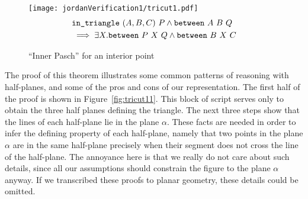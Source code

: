 \begin{figure}
\centering\texttt{[image: jordanVerification1/tricut1.pdf]}
\begin{equation}\label{eq:tricut1}
  \begin{split}
    &\texttt{in\_triangle}\ (A,B,C)\ P \wedge \texttt{between}\ A\ B\ Q \\
    &\implies\exists X. \texttt{between}\ P\ X\ Q \wedge \texttt{between}\ B\ X\ C
  \end{split}
\end{equation}
\caption{``Inner Pasch'' for an interior point}
\label{fig:tricut1}
\end{figure}

The proof of this theorem illustrates some common patterns of reasoning with half-planes, and some of the pros and cons of our representation. The first half of the proof is shown in Figure~\ref{fig:tricut11}. This block of script serves only to obtain the three half planes defining the triangle. The next three steps show that the lines of each half-plane lie in the plane $\alpha$. These facts are needed in order to infer the defining property of each half-plane, namely that two points in the plane $\alpha$ are in the same half-plane precisely when their segment does not cross the line of the half-plane. The annoyance here is that we really do not care about such details, since all our assumptions should constrain the figure to the plane $\alpha$ anyway. If we transcribed these proofs to planar geometry, these details could be omitted. 

